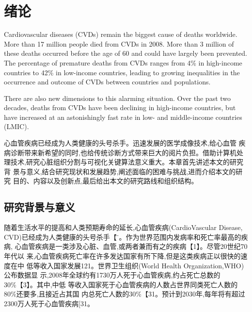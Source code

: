 
\chapter{绪论}
Cardiovascular diseases (CVDs) remain the biggest cause of
deaths worldwide. More than 17 million people died from CVDs
in 2008. More than 3 million of these deaths occurred before the
age of 60 and could have largely been prevented. The percentage
of premature deaths from CVDs ranges from 4\% in high-income
countries to 42\% in low-income countries, leading to growing
inequalities in the occurrence and outcome of CVDs between
countries and populations.

There are also new dimensions to this alarming situation. Over
the past two decades, deaths from CVDs have been declining in
high-income countries, but have increased at an astonishingly
fast rate in low- and middle-income countries (LMIC).

心血管疾病已经成为人类健康的头号杀手。迅速发展的医学成像技术,给心血管
疾病诊断带来新希望的同时,也给传统诊断方式带来巨大的阅片负担。借助计算机处
理技术,研究心脏组织分割与可视化关键算法意义重大。本章首先讲述本文的研究背
景与意义,结合研究现状和发展趋势,阐述面临的困难与挑战,进而介绍本文的研究
目的、内容以及创新点,最后给出本文的研究路线和组织结构。

\section{研究背景与意义}
随着生活水平的提高和人类预期寿命的延长,心血管疾病(CardioVascular
 Disease,
 CVD)已经成为人类健康的头号杀手【 ̈。作为世界范围内发病率和死亡率最高的疾病,
 心血管疾病是一类涉及心脏、血管,或两者兼而有之的疾病【1】。尽管20世纪70年代以
 来,心血管疾病死亡率在许多发达国家有所下降,但是这类疾病正以很快的速度在中
 低等收入国家发展121。世界卫生组织(World
 Health  Organization,WHO)公布数据显
   示,2008年全球约有1730万人死于心血管疾病,约占死亡总数的30\%【3】。其中,中低
   等收入国家死于心血管疾病的人数占世界同类死亡人数的80\%还要多,且接近占其国
   内总死亡人数的30\%【31。预计到2030年,每年将有超过2300万人死于心血管疾病[31。

